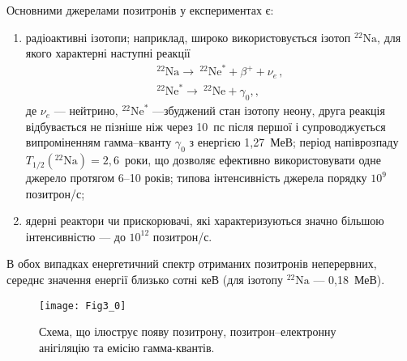 Основними джерелами позитронів у експериментах є:
\begin{enumerate}[label=\asbuk*),leftmargin=0em,itemindent=1.5em]
  \item радіоактивні ізотопи;
  наприклад,  широко використовується ізотоп $^{22}\text{Na}$, для якого характерні наступні реакції
  \begin{gather*}
  ^{22}\text{Na}\rightarrow \:^{22}\text{Ne}^{*}+\beta^++\nu_e\,,\\
  ^{22}\text{Ne}^{*}\rightarrow \:^{22}\text{Ne}+\gamma_{0},,
  \end{gather*}
де
$\nu_e$ --- нейтрино,
$^{22}\text{Ne}^{*}$ ---збуджений стан ізотопу неону,
друга реакція відбувається не пізніше ніж через 10~пс після першої і супроводжується
випроміненням гамма--кванту $\gamma_0$ з енергією 1,27~МеВ;
період напіврозпаду $T_{1/2}(^{22}\text{Na})=2,6$~роки, що
дозволяє ефективно використовувати одне джерело протягом 6--10 років;
 типова інтенсивність джерела порядку $10^9$ позитрон/с;
  \item ядерні реактори чи прискорювачі, які характеризуються значно більшою інтенсивністю --- до $10^{12}$ позитрон/с.
\end{enumerate}
В обох випадках енергетичний спектр отриманих позитронів неперервних,
середнє значення енергії близько сотні кеВ (для ізотопу $^{22}\text{Na}$ --- 0,18~МеВ).

\begin{figure}[t]
\center
\vspace{-5mm}
\texttt{[image: Fig3\_0]}
\vspace{-3mm}
\caption{Схема, що ілюструє появу позитрону, позитрон--електронну анігіляцію
та емісію гамма-квантів.}
\vspace{-3mm}
\label{F30}
\end{figure}


